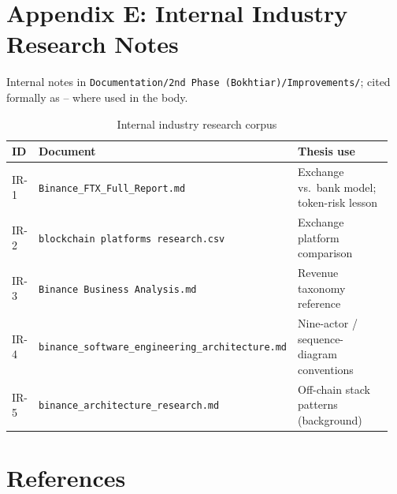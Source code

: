 \documentclass[12pt, a4paper]{report}
\newcommand{\tableheadcolor}{\rowcolor{TableHeadBg}}
\begin{document}
\chapter*{Appendix E: Internal Industry Research Notes}
{}
\label{app:internal-research}

Internal notes in \texttt{Documentation/2nd Phase (Bokhtiar)/Improvements/}; cited formally as -- where used in the body.

\begin{table}[H]
\centering
\caption[Internal industry research corpus]{Internal industry research corpus}
\label{tab:internal-research}
\footnotesize
\begin{tabular}{@{}%
 >{\raggedright\arraybackslash}p{0.07\linewidth}%
 >{\raggedright\arraybackslash}p{0.36\linewidth}%
 >{\raggedright\arraybackslash}p{0.53\linewidth}@{}}
\toprule
\tableheadcolor
\textbf{ID} & \textbf{Document} & \textbf{Thesis use} \\
\midrule
IR-1 & \texttt{Binance\_FTX\_Full\_Report.md} & Exchange vs.\ bank model; token-risk lesson \\
IR-2 & \texttt{blockchain platforms research.csv} & Exchange platform comparison \\
IR-3 & \texttt{Binance Business Analysis.md} & Revenue taxonomy reference \\
IR-4 & \texttt{binance\_software\_engineering\_architecture.md} & Nine-actor / sequence-diagram conventions \\
IR-5 & \texttt{binance\_architecture\_research.md} & Off-chain stack patterns (background) \\
\bottomrule
\end{tabular}
\end{table}


\chapter*{References}
{}
\end{document}
